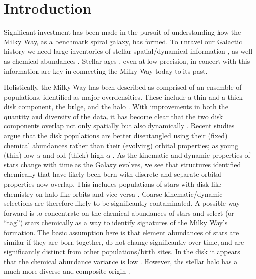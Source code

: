 \documentclass[fleqn,usenatbib]{mnras}
\begin{document}
\section{Introduction} \label{sec:introduction}

Significant investment has been made in the pursuit of understanding how the Milky Way, as a benchmark spiral galaxy, has formed. To unravel our Galactic history we need large inventories of stellar spatial/dynamical information \citep[e.g.][]{Brown2021}, as well as chemical abundances \citep{Jofre2019}. Stellar ages \citep{Soderblom2010}, even at low precision, in concert with this information are key in connecting the Milky Way today to its past.

Holistically, the Milky Way has been described as comprised of an ensemble of populations, identified as major overdensities. These include a thin and a thick disk component, the bulge, and the halo \citep[see e.g.][for a review]{BlandHawthorn_Gerhard2016}. With improvements in both the quantity and diversity of the data, it has become clear that the two disk components overlap not only spatially but also dynamically \citep[e.g.][]{Bovy2012b}. Recent studies argue that the disk populations are better disentangled using their (fixed) chemical abundances rather than their (evolving) orbital properties; as young (thin) low-$\alpha$ and old (thick) high-$\alpha$ \citep[e.g.][]{Bensby2014, Buder2019, BlandHawthorn2019}. As the kinematic and dynamic properties of stars change with time as the Galaxy evolves, we see that structures identified chemically that have likely been born with discrete and separate orbital properties now overlap. This includes populations of stars with disk-like chemistry on halo-like orbits and vice-versa \citep[e.g.][]{Belokurov2020}. Coarse kinematic/dynamic selections are therefore likely to be significantly contaminated. A possible way forward is to concentrate on the chemical abundances of stars and select (or ``tag'') stars chemically \citep[see e.g.][for a review on chemical tagging]{FreemanBlandHawthorn2002} as a way to identify signatures of the Milky Way's formation. The basic assumption here is that element abundances of stars are similar if they are born together, do not change significantly over time, and are significantly distinct from other populations/birth sites. In the disk it appears that the chemical abundance variance is low \citep{Bovy2016b, Ness2018, Ness2019b, Weinberg2021, Ting2021}. However, the stellar halo has a much more diverse and composite origin \citep[e.g.][]{Helmi2020, Naidu2020}. 
\end{document}
